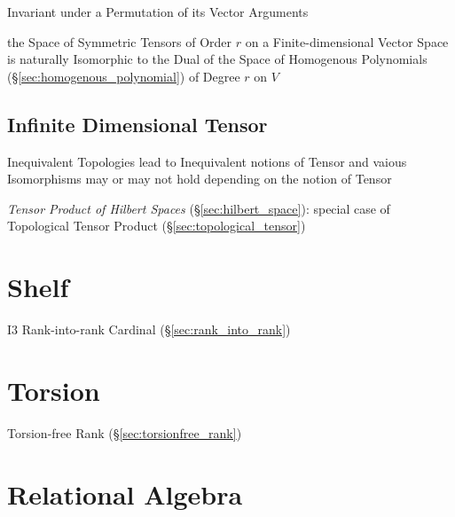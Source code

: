 Invariant under a Permutation of its Vector Arguments

the Space of Symmetric Tensors of Order $r$ on a Finite-dimensional Vector
Space is naturally Isomorphic to the Dual of the Space of Homogenous
Polynomials (\S\ref{sec:homogenous_polynomial}) of Degree $r$ on $V$



\subsection{Infinite Dimensional Tensor}
\label{sec:infinite_dimensional_tensor}

Inequivalent Topologies lead to Inequivalent notions of Tensor and
vaious Isomorphisms may or may not hold depending on the notion of
Tensor

\emph{Tensor Product of Hilbert Spaces} (\S\ref{sec:hilbert_space}):
special case of Topological Tensor Product
(\S\ref{sec:topological_tensor})



\section{Shelf}\label{sec:shelf}

I3 Rank-into-rank Cardinal (\S\ref{sec:rank_into_rank})



\section{Torsion}\label{sec:torsion}

Torsion-free Rank (\S\ref{sec:torsionfree_rank})



\section{Relational Algebra}\label{sec:relational_algebra}

